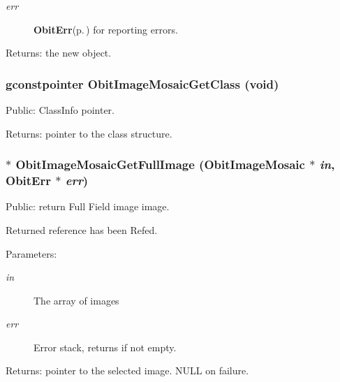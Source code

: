 \begin{Desc}
\begin{description}
\begin{itemize}
\end{itemize}
\item[{\em err}]{\bf Obit\-Err}{\rm (p.\,\pageref{structObitErr})} for reporting errors. \end{description}
\end{Desc}
\begin{Desc}
\item[Returns:]the new object. \end{Desc}
\subsubsection{\setlength{\rightskip}{0pt plus 5cm}gconstpointer Obit\-Image\-Mosaic\-Get\-Class (void)}\label{ObitImageMosaic_8c_a13}


Public: Class\-Info pointer. 

\begin{Desc}
\item[Returns:]pointer to the class structure. \end{Desc}
\subsubsection{$\ast$ Obit\-Image\-Mosaic\-Get\-Full\-Image ({\bf Obit\-Image\-Mosaic} $\ast$ {\em in}, {\bf Obit\-Err} $\ast$ {\em err})}\label{ObitImageMosaic_8c_a18}


Public: return Full Field image image. 

Returned reference has been Refed. \begin{Desc}
\item[Parameters:]
\begin{description}
\item[{\em in}]The array of images \item[{\em err}]Error stack, returns if not empty. \end{description}
\end{Desc}
\begin{Desc}
\item[Returns:]pointer to the selected image. NULL on failure. \end{Desc}
